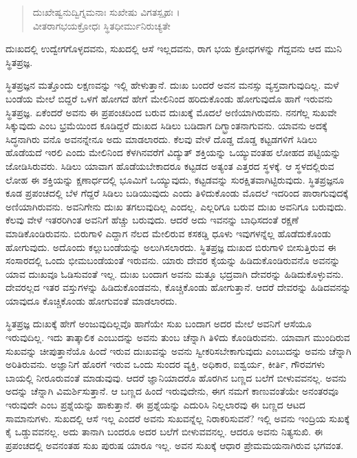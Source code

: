 \begin{verse}
ದುಃಖೇಷ್ವನುದ್ವಿಗ್ನಮನಾಃ ಸುಖೇಷು ವಿಗತಸ್ಪೃಹಃ ।\\ವೀತರಾಗಭಯಕ್ರೋಧಃ ಸ್ಥಿತಧೀರ್ಮುನಿರುಚ್ಯತೇ 
\end{verse}

{\small ದುಃಖದಲ್ಲಿ ಉದ್ವೇಗಗೊಳ್ಳದವನು, ಸುಖದಲ್ಲಿ ಆಸೆ ಇಲ್ಲದವನು, ರಾಗ ಭಯ ಕ್ರೋಧಗಳನ್ನು ಗೆದ್ದವನು ಆದ ಮುನಿ ಸ್ಥಿತಪ್ರಜ್ಞ.}

ಸ್ಥಿತಪ್ರಜ್ಞನ ಮತ್ತೊಂದು ಲಕ್ಷಣವನ್ನು ಇಲ್ಲಿ ಹೇಳುತ್ತಾನೆ. ದುಃಖ ಬಂದರೆ ಅವನ ಮನಸ್ಸು ವ್ಯಸ್ತವಾಗುವುದಿಲ್ಲ. ಮಳೆ ಬಂಡೆಯ ಮೇಲೆ ಬಿದ್ದರೆ ಒಳಗೆ ಹೋಗದೆ ಹೇಗೆ ಮೇಲಿನಿಂದ ಹರಿದುಕೊಂಡು ಹೋಗುವುದೊ ಹಾಗೆ ಇರುವನು ಸ್ಥಿತಪ್ರಜ್ಞ. ಏಕೆಂದರೆ ಅವನು ಈ ಪ್ರಪಂಚದಿಂದ ಬರುವ ದುಃಖಕ್ಕೆ ಮೊದಲೆ ಅಣಿಯಾಗಿರುವನು. ನನಗೆಲ್ಲ ಸುಖವೇ ಸಿಕ್ಕುವುದು ಎಂಬ ಭ್ರಮೆಯಿಂದ ಕೂಡಿದ್ದರೆ ದುಃಖದ ಸಿಡಿಲು ಬಡಿದಾಗ ದಿಗ್ಭ್ರಾಂತನಾಗುವನು. ಯಾವನು ಅದಕ್ಕೆ ಸಿದ್ಧನಾಗಿರು ವನೊ ಅವನನ್ನೇನೂ ಅದು ಮಾಡಲಾರದು. ಕೆಲವು ವೇಳೆ ದೊಡ್ಡ ದೊಡ್ಡ ಕಟ್ಟಡಗಳಿಗೆ ಸಿಡಿಲು ಹೊಡೆಯದೆ ಇರಲಿ ಎಂದು ಮೇಲಿನಿಂದ ಕೆಳಗಿನವರೆಗೆ ವಿದ್ಯುತ್ ಶಕ್ತಿಯನ್ನು ಒಯ್ಯುವಂತಹ ಲೋಹದ ಪಟ್ಟಿಯನ್ನು ಜೋಡಿಸಿರುವರು. ಸಿಡಿಲು ಯಾವಾಗ ಹೊಡೆಯಬೇಕಾದರೂ ಕಟ್ಟಡದ ಅತ್ಯಂತ ಎತ್ತರದ ಸ್ಥಳಕ್ಕೆ. ಆ ಸ್ಥಳದಲ್ಲಿರುವ ಲೋಹ ಈ ಶಕ್ತಿಯನ್ನು ಕ್ಷಣಾರ್ಧದಲ್ಲಿ ಭೂಮಿಗೆ ಒಯ್ಯುವುದು, ಕಟ್ಟಡವನ್ನು ಸುರಕ್ಷಿತವಾಗಿಟ್ಟಿರುವುದು. ಸ್ಥಿತಪ್ರಜ್ಞನೂ ಕೂಡ ಪ್ರಪಂಚದಲ್ಲಿ ಬೆಳ ಗೆದ್ದರೆ ಸಿಡಿಲು ಬಡಿಯುವುದು ಎಂದು ತಿಳಿದುಕೊಂಡು ಮೊದಲೆ ಇದರಿಂದ ಪಾರಾಗುವುದಕ್ಕೆ ಅಣಿಯಾಗಿರುವನು. ಅವನಿಗೇನು ದುಃಖ ತಗಲುವುದಿಲ್ಲ ಎಂದಲ್ಲ. ಎಲ್ಲರಿಗೂ ಬರುವ ದುಃಖ ಅವನಿಗೂ ಬರುವುದು. ಕೆಲವು ವೇಳೆ ಇತರರಿಗಿಂತ ಅವನಿಗೆ ಹೆಚ್ಚು ಬರುವುದು. ಆದರೆ ಅದು ಇವನನ್ನು ಬಾಧಿಸದಂತೆ ರಕ್ಷಣೆ ಮಾಡಿಕೊಂಡಿರುವನು. ಬಿರುಗಾಳಿ ಎದ್ದಾಗ ನೆಲದ ಮೇಲಿರುವ ಕಸಕಡ್ಡಿ ಧೂಳು ಇವುಗಳನ್ನೆಲ್ಲ ಹೊಡೆದುಕೊಂಡು ಹೋಗುವುದು. ಅದೊಂದು ಕಲ್ಲುಬಂಡೆಯನ್ನು ಅಲುಗಿಸಲಾರದು. ಸ್ಥಿತಪ್ರಜ್ಞ ದುಃಖದ ಬಿರುಗಾಳಿ ಬೀಸುತ್ತಿರುವ ಈ ಸಂಸಾರದಲ್ಲಿ ಒಂದು ಭೀಮಬಂಡೆಯಂತೆ ಇರುವನು. ಯಾರು ದೇವರ ಕೈಯನ್ನು ಹಿಡಿದುಕೊಂಡಿರುವನೊ ಅವನನ್ನು ಯಾವ ದುಃಖವೂ ಓಡಿಸುವಂತೆ ಇಲ್ಲ. ದುಃಖ ಬಂದಾಗ ಅವನು ಮತ್ತೂ ಭದ್ರವಾಗಿ ದೇವರನ್ನು ಹಿಡಿದುಕೊಳ್ಳುವನು. ದೇವರಲ್ಲದ ಇತರ ವಸ್ತುಗಳನ್ನು ಹಿಡಿದುಕೊಂಡವನು, ಕೊಚ್ಚಿಕೊಂಡು ಹೋಗುತ್ತಾನೆ. ಆದರೆ ದೇವರನ್ನು ಹಿಡಿದವನನ್ನು ಯಾವುದೂ ಕೊಚ್ಚಿಕೊಂಡು ಹೋಗುವಂತೆ ಮಾಡಲಾರದು.

ಸ್ಥಿತಪ್ರಜ್ಞ ದುಃಖಕ್ಕೆ ಹೇಗೆ ಅಂಜುವುದಿಲ್ಲವೊ ಹಾಗೆಯೇ ಸುಖ ಬಂದಾಗ ಅದರ ಮೇಲೆ ಅವನಿಗೆ ಆಸೆಯೂ ಇರುವುದಿಲ್ಲ. ಇದು ತಾತ್ಕಾಲಿಕ ಎಂಬುದನ್ನು ಅವನು ತುಂಬ ಚೆನ್ನಾಗಿ ತಿಳಿದು ಕೊಂಡಿರುವನು. ಯಾವಾಗ ಮುಂದಿರುವ ಸುಖವನ್ನು ಚೀಪುತ್ತಾನೆಯೊ ಹಿಂದೆ ಇರುವ ದುಃಖವನ್ನು ಅವನು ಸ್ವೀಕರಿಸಬೇಕಾಗುವುದು ಎಂಬುದನ್ನು ಅವನು ಚೆನ್ನಾಗಿ ಅರಿತಿರುವನು. ಅಜ್ಞಾನಿಗೆ ಹೊರಗೆ ಇರುವ ಒಂದು ಸುಂದರ ವ್ಯಕ್ತಿ, ಅಧಿಕಾರ, ಐಶ್ವರ್ಯ, ಕೀರ್ತಿ, ಗೌರವಗಳು ಬಾಯಲ್ಲಿ ನೀರೂರುವಂತೆ ಮಾಡುವುವು. ಆದರೆ ಜ್ಞಾನಿಯಾದರೊ ಹೊರಗಿನ ಬಣ್ಣದ ಬಲೆಗೆ ಬೀಳುವವನಲ್ಲ. ಅವನು ಅದನ್ನು ಚೆನ್ನಾಗಿ ವಿಮರ್ಶಿಸುತ್ತಾನೆ. ಆ ಬಣ್ಣದ ಹಿಂದೆ ಇರುವುದೇನು, ಈಗ ನಮಗೆ ಕಾಣುವಂತೆಯೇ ಅನಂತರವೂ ಇರುವುದೇ ಎಂಬ ಪ್ರಶ್ನೆಯನ್ನು ಹಾಕುತ್ತಾನೆ. ಈ ಪ್ರಶ್ನೆಯನ್ನು ಎದುರಿಸಿ ನಿಲ್ಲಲಾರವು ಈ ಬಣ್ಣದ ಆಟದ ಸಾಮಾನುಗಳು. ಸುಖದಲ್ಲಿ ಆಸೆ ಇಲ್ಲ ಎಂದರೆ ಅವನು ಸುಖವನ್ನೆಲ್ಲ ನಿರಾಕರಿಸುವನೆ? ಇಲ್ಲಿ ಅವನು ಇಂದ್ರಿಯ ಸುಖಕ್ಕೆ ಕೈ ಒಡ್ಡುವವನಲ್ಲ. ಅದು ತಾನಾಗಿ ಬಂದರೂ ಅದರ ಬಲೆಗೆ ಬೀಳುವವನಲ್ಲ. ಆದರೂ ಅವನು ನಿತ್ಯಸುಖಿ. ಈ ಪ್ರಪಂಚದಲ್ಲಿ ಅವನಂತಹ ಸುಖ ಪುರುಷ ಯಾರೂ ಇಲ್ಲ. ಅವನ ಸುಖಕ್ಕೆ ಆಧಾರ ಪ್ರೇಮಮಯನಾಗಿರುವ ಭಗವಂತ.

